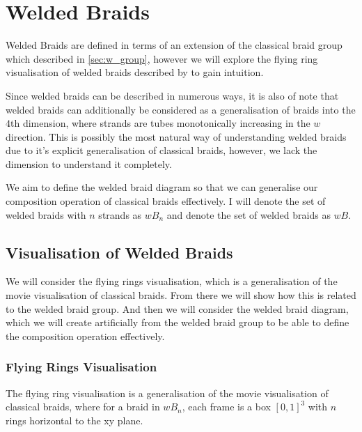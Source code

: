 
\chapter{Welded Braids}

Welded Braids are defined in terms of an extension of the classical braid group which described in \cref{sec:w_group}, however we will explore the flying ring visualisation of welded braids described by \cite{Bar_Natan_2016} to gain intuition.

Since welded braids can be described in numerous ways, it is also of note that welded braids can additionally be considered as a generalisation of braids into the \( 4 \)th dimension, where strands are tubes monotonically increasing in the \( w \) direction. 
This is possibly the most natural way of understanding welded braids due to it's explicit generalisation of classical braids, however, we lack the dimension to understand it completely. 

We aim to define the welded braid diagram so that we can generalise our composition operation of classical braids effectively. 
I will denote the set of welded braids with \( n \) strands as \( wB_n \) and denote the set of welded braids as \( wB \). 

\section{Visualisation of Welded Braids}

We will consider the flying rings visualisation, which is a generalisation of the movie visualisation of classical braids.
From there we will show how this is related to the welded braid group. 
And then we will consider the welded braid diagram, which we will create artificially from the welded braid group to be able to define the composition operation effectively. 

\subsection{Flying Rings Visualisation}

The flying ring visualisation is a generalisation of the movie visualisation of classical braids, where for a braid in \( wB_n \), each frame is a box \( [0, 1]^3 \) with \( n \) rings horizontal to the xy plane. 


